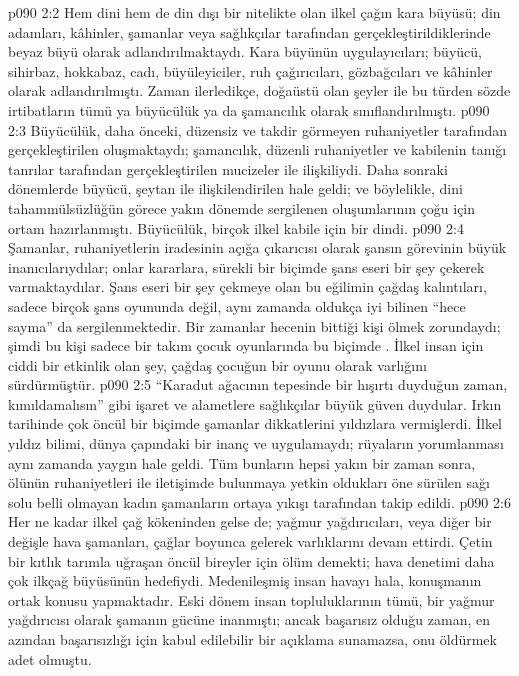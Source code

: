 \vs p090 2:2 Hem dini hem de din dışı bir nitelikte olan ilkel çağın kara büyüsü; din adamları, kâhinler, şamanlar veya sağlıkçılar tarafından gerçekleştirildiklerinde beyaz büyü olarak adlandırılmaktaydı. Kara büyünün uygulayıcıları; büyücü, sihirbaz, hokkabaz, cadı, büyüleyiciler, ruh çağırıcıları, gözbağcıları ve kâhinler olarak adlandırılmıştı. Zaman ilerledikçe, doğaüstü olan şeyler ile bu türden sözde irtibatların tümü ya büyücülük ya da şamancılık olarak sınıflandırılmıştı.
\vs p090 2:3 Büyücülük, daha önceki, düzensiz ve takdir görmeyen ruhaniyetler tarafından gerçekleştirilen  oluşmaktaydı; şamancılık, düzenli ruhaniyetler ve kabilenin tanığı tanrılar tarafından gerçekleştirilen mucizeler ile ilişkiliydi. Daha sonraki dönemlerde büyücü, şeytan ile ilişkilendirilen hale geldi; ve böylelikle, dini tahammülsüzlüğün görece yakın dönemde sergilenen oluşumlarının çoğu için ortam hazırlanmıştı. Büyücülük, birçok ilkel kabile için bir dindi.
\vs p090 2:4 Şamanlar, ruhaniyetlerin iradesinin açığa çıkarıcısı olarak şansın görevinin büyük inanıcılarıydılar; onlar kararlara, sürekli bir biçimde şans eseri bir şey çekerek varmaktaydılar. Şans eseri bir şey çekmeye olan bu eğilimin çağdaş kalıntıları, sadece birçok şans oyununda değil, aynı zamanda oldukça iyi bilinen “hece sayma” da sergilenmektedir. Bir zamanlar hecenin bittiği kişi ölmek zorundaydı; şimdi bu kişi sadece bir takım çocuk oyunlarında bu biçimde . İlkel insan için ciddi bir etkinlik olan şey, çağdaş çocuğun bir oyunu olarak varlığını sürdürmüştür.
\vs p090 2:5 “Karadut ağacının tepesinde bir hışırtı duyduğun zaman, kımıldamalısın” gibi işaret ve alametlere sağlıkçılar büyük güven duydular. Irkın tarihinde çok öncül bir biçimde şamanlar dikkatlerini yıldızlara vermişlerdi. İlkel yıldız bilimi, dünya çapındaki bir inanç ve uygulamaydı; rüyaların yorumlanması aynı zamanda yaygın hale geldi. Tüm bunların hepsi yakın bir zaman sonra, ölünün ruhaniyetleri ile iletişimde bulunmaya yetkin oldukları öne sürülen sağı solu belli olmayan kadın şamanların ortaya yıkışı tarafından takip edildi.
\vs p090 2:6 Her ne kadar ilkel çağ kökeninden gelse de; yağmur yağdırıcıları, veya diğer bir değişle hava şamanları, çağlar boyunca gelerek varlıklarını devam ettirdi. Çetin bir kıtlık tarımla uğraşan öncül bireyler için ölüm demekti; hava denetimi daha çok ilkçağ büyüsünün hedefiydi. Medenileşmiş insan havayı hala, konuşmanın ortak konusu yapmaktadır. Eski dönem insan topluluklarının tümü, bir yağmur yağdırıcısı olarak şamanın gücüne inanmıştı; ancak başarısız olduğu zaman, en azından başarısızlığı için kabul edilebilir bir açıklama sunamazsa, onu öldürmek adet olmuştu.
